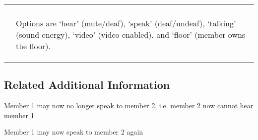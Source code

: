 \documentclass[letterpaper,10pt,english]{sphinxmanual}
\begin{document}
\begin{savenotes}\sphinxattablestart
\centering
\begin{tabulary}{\linewidth}[t]{|T|T|}
\hline

&
\\
\hline
{}
&\\
\hline
{}
&\\
\hline
{}
&\\
\hline
{}
&\\
\hline
{}
&
Options are ‘hear’ (mute/deaf), ‘speak’ (deaf/undeaf), ‘talking’ (sound energy), ‘video’ (video enabled), and ‘floor’ (member owns the floor).
\\
\hline
{}
&\\
\hline
{}
&\\
\hline
{}
&\\
\hline
\end{tabulary}
\par
\sphinxattableend\end{savenotes}


\subsection{Related Additional Information}
\label{\detokenize{restapi:related-additional-information}}

Member 1 may now no longer speak to member 2, i.e. member 2 now cannot hear member 1

\begin{sphinxVerbatim}[commandchars=\\\{\}]
     
\end{sphinxVerbatim}

Member 1 may now speak to member 2 again

\begin{sphinxVerbatim}[commandchars=\\\{\}]
     
\end{sphinxVerbatim}
\end{document}

